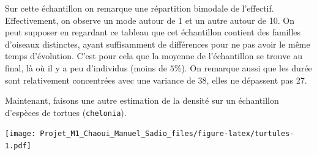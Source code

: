 \documentclass[
]{book}
\newenvironment{Shaded}{\begin{snugshade}}{\end{snugshade}}
\newcommand{\CommentTok}[1]{\textcolor[rgb]{0.56,0.35,0.01}{\textit{#1}}}
\newcommand{\DataTypeTok}[1]{\textcolor[rgb]{0.13,0.29,0.53}{#1}}
\newcommand{\DecValTok}[1]{\textcolor[rgb]{0.00,0.00,0.81}{#1}}
\newcommand{\FloatTok}[1]{\textcolor[rgb]{0.00,0.00,0.81}{#1}}
\newcommand{\KeywordTok}[1]{\textcolor[rgb]{0.13,0.29,0.53}{\textbf{#1}}}
\newcommand{\NormalTok}[1]{#1}
\newcommand{\OperatorTok}[1]{\textcolor[rgb]{0.81,0.36,0.00}{\textbf{#1}}}
\newcommand{\StringTok}[1]{\textcolor[rgb]{0.31,0.60,0.02}{#1}}
\begin{document}
Sur cette échantillon on remarque une répartition bimodale de l'effectif. Effectivement, on observe un mode autour de 1 et un autre autour de 10. On peut supposer en regardant ce tableau que cet échantillon contient des familles d'oiseaux distinctes, ayant suffisamment de différences pour ne pas avoir le même temps d'évolution. C'est pour cela que la moyenne de l'échantillon se trouve au final, là où il y a peu d'individus (moins de \(5\%\)). On remarque aussi que les durée sont relativement concentrées avec une variance de \(38\), elles ne dépassent pas 27.

Maintenant, faisons une autre estimation de la densité sur un échantillon d'espèces de tortues (\texttt{chelonia}).

\begin{Shaded}
\end{Shaded}

\texttt{[image: Projet\_M1\_Chaoui\_Manuel\_Sadio\_files/figure-latex/turtules-1.pdf]}

\begin{Shaded}
\end{Shaded}
\end{document}
